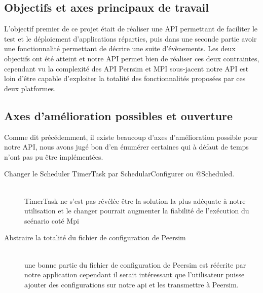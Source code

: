 \documentclass{article}
\begin{document}
			\subsection{Objectifs et axes principaux de travail}
			L'objectif premier de ce projet était de réaliser une API permettant de faciliter le test et le déploiement d'applications réparties, puis dans une seconde partie avoir une 
			fonctionnalité permettant de décrire une suite d'évènements. 
			\newline
			Les deux objectifs ont été atteint et notre API permet bien de réaliser ces deux contraintes,
			cependant vu la complexité des API Perrsim et MPI sous-jacent notre API est loin d'être capable d'exploiter la totalité des fonctionnalités proposées par ces deux platformes.
			\subsection{Axes d'amélioration possibles et ouverture}
			Comme dit précédemment, il existe beaucoup d'axes d'amélioration possible pour notre API, nous avons jugé bon d'en énumérer certaines qui à défaut de temps n'ont pas pu être implémentées.

			\begin{description}
				\item[Changer le Scheduler TimerTask par SchedularConfigurer ou @Scheduled.] \hfill \\ TimerTask ne s'est pas révélée être la solution la plus adéquate à notre utilisation et le changer pourrait augmenter la fiabilité de l'exécution du scénario coté Mpi
				\item[Abstraire la totalité du fichier de configuration de Peersim] \hfill \\ une bonne partie du fichier de configuration de Peersim est réécrite par notre application cependant il serait intéressant que l'utilisateur puisse ajouter des configurations sur notre api et les transmettre à Peersim.
			  \end{description}
		

			  \newpage
\end{document}
